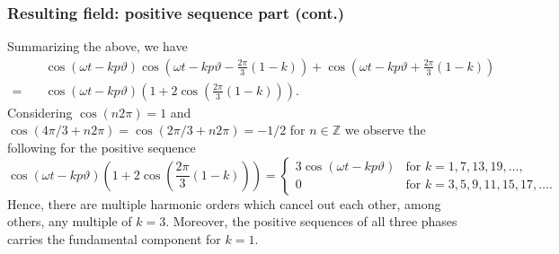 \begin{frame}
	\frametitle{Resulting field: positive sequence part (cont.)}
    Summarizing the above, we have
        \begin{align*}
        &\cos(\omega t - k p \vartheta)  \cos(\omega t - k p \vartheta - \frac{2\pi}{3}(1-k)) + \cos(\omega t - k p \vartheta + \frac{2\pi}{3}(1-k))\\
         = \quad &\cos(\omega t - k p \vartheta)(1+2\cos(\frac{2\pi}{3}(1-k))).
    \end{align*}
    Considering $\cos(n 2 \pi)=1$ and $\cos(4\pi/3 + n 2 \pi) = \cos(2\pi/3 + n 2 \pi)=-1/2$ for $n \in \mathbb{Z}$ we observe the following for the positive sequence
    \begin{equation}
        \cos(\omega t - k p \vartheta)(1+2\cos(\frac{2\pi}{3}(1-k))) = \begin{cases}
            3 \cos(\omega t - k p \vartheta) & \text{for } k=1,7,13,19,\ldots, \\
            0 & \text{for } k=3,5,9,11,15, 17,\ldots.
        \end{cases}
    \end{equation}
    Hence, there are multiple harmonic orders which cancel out each other, among others, any multiple of $k=3$. Moreover, the positive sequences of all three phases carries the fundamental component for $k=1$.    
\end{frame}

